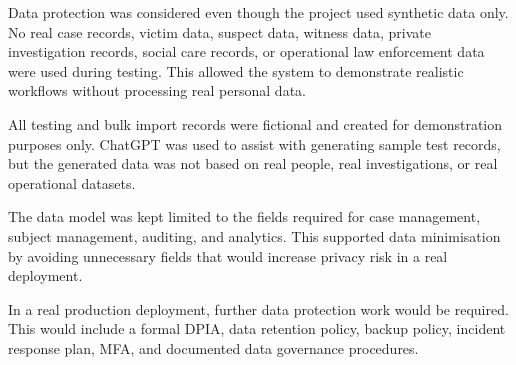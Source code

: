 Data protection was considered even though the project used synthetic data only. No real case records, victim data, suspect data, witness data, private investigation records, social care records, or operational law enforcement data were used during testing. This allowed the system to demonstrate realistic workflows without processing real personal data.

All testing and bulk import records were fictional and created for demonstration purposes only. ChatGPT was used to assist with generating sample test records, but the generated data was not based on real people, real investigations, or real operational datasets.

The data model was kept limited to the fields required for case management, subject management, auditing, and analytics. This supported data minimisation by avoiding unnecessary fields that would increase privacy risk in a real deployment.

In a real production deployment, further data protection work would be required. This would include a formal DPIA, data retention policy, backup policy, incident response plan, MFA, and documented data governance procedures.